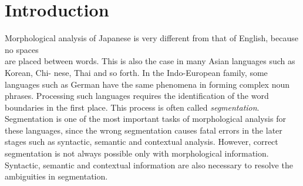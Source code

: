 


\maketitle

\section{Introduction}
\label{sec:introduction}

\hspace{-0.2mm}Morphological \hspace{-0.2mm}analysis \hspace{-0.2mm}of \hspace{-0.2mm}Japanese \hspace{-0.2mm}is \hspace{-0.2mm}very \hspace{-0.2mm}different \hspace{-0.2mm}from \hspace{-0.2mm}that \hspace{-0.2mm}of
\hspace{-0.2mm}English, \hspace{-0.2mm}because \hspace{-0.2mm}no \hspace{-0.2mm}spaces\\ are \hspace{-0.2mm}placed \hspace{-0.2mm}between \hspace{-0.2mm}words. \hspace{-0.2mm}This \hspace{-0.2mm}is \hspace{-0.2mm}also \hspace{-0.2mm}the
\hspace{-0.2mm}case \hspace{-0.2mm}in \hspace{-0.2mm}many \hspace{-0.2mm}Asian \hspace{-0.2mm}languages \hspace{-0.2mm}such \hspace{-0.2mm}as \hspace{-0.2mm}Korean, \hspace{-0.2mm}Chi- nese, Thai and so
forth. In the Indo-European family, some languages such as German have
the same phenomena in forming complex noun phrases. Processing such
languages requires the identification of the word boundaries in the
first place. This process is often called {\em segmentation\/}.
Segmentation is one of the most important tasks of morphological
analysis for these languages, since the wrong segmentation causes
fatal errors in the later stages such as syntactic, semantic and
contextual analysis. However, correct segmentation is not always
possible only with morphological information. Syntactic, semantic and
contextual information are also necessary to resolve the ambiguities
in segmentation.

